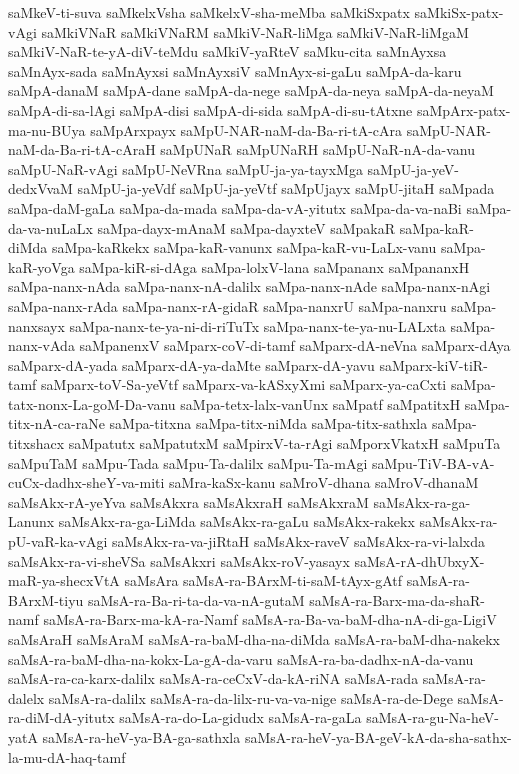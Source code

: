 {saMkeV-ti-suva
saMkelxVsha
saMkelxV-sha-meMba
saMkiSxpatx
saMkiSx-patx-vAgi
saMkiVNaR
saMkiVNaRM
saMkiV-NaR-liMga
saMkiV-NaR-liMgaM
saMkiV-NaR-te-yA-diV-teMdu
saMkiV-yaRteV
saMku-cita
saMnAyxsa
saMnAyx-sada
saMnAyxsi
saMnAyxsiV
saMnAyx-si-gaLu
saMpA-da-karu
saMpA-danaM
saMpA-dane
saMpA-da-nege
saMpA-da-neya
saMpA-da-neyaM
saMpA-di-sa-lAgi
saMpA-disi
saMpA-di-sida
saMpA-di-su-tAtxne
saMpArx-patx-ma-nu-BUya
saMpArxpayx
saMpU-NAR-naM-da-Ba-ri-tA-cAra
saMpU-NAR-naM-da-Ba-ri-tA-cAraH
saMpUNaR
saMpUNaRH
saMpU-NaR-nA-da-vanu
saMpU-NaR-vAgi
saMpU-NeVRna
saMpU-ja-ya-tayxMga
saMpU-ja-yeV-dedxVvaM
saMpU-ja-yeVdf
saMpU-ja-yeVtf
saMpUjayx
saMpU-jitaH
saMpada
saMpa-daM-gaLa
saMpa-da-mada
saMpa-da-vA-yitutx
saMpa-da-va-naBi
saMpa-da-va-nuLaLx
saMpa-dayx-mAnaM
saMpa-dayxteV
saMpakaR
saMpa-kaR-diMda
saMpa-kaRkekx
saMpa-kaR-vanunx
saMpa-kaR-vu-LaLx-vanu
saMpa-kaR-yoVga
saMpa-kiR-si-dAga
saMpa-lolxV-lana
saMpananx
saMpananxH
saMpa-nanx-nAda
saMpa-nanx-nA-dalilx
saMpa-nanx-nAde
saMpa-nanx-nAgi
saMpa-nanx-rAda
saMpa-nanx-rA-gidaR
saMpa-nanxrU
saMpa-nanxru
saMpa-nanxsayx
saMpa-nanx-te-ya-ni-di-riTuTx
saMpa-nanx-te-ya-nu-LALxta
saMpa-nanx-vAda
saMpanenxV
saMparx-coV-di-tamf
saMparx-dA-neVna
saMparx-dAya
saMparx-dA-yada
saMparx-dA-ya-daMte
saMparx-dA-yavu
saMparx-kiV-tiR-tamf
saMparx-toV-Sa-yeVtf
saMparx-va-kASxyXmi
saMparx-ya-caCxti
saMpa-tatx-nonx-La-goM-Da-vanu
saMpa-tetx-lalx-vanUnx
saMpatf
saMpatitxH
saMpa-titx-nA-ca-raNe
saMpa-titxna
saMpa-titx-niMda
saMpa-titx-sathxla
saMpa-titxshacx
saMpatutx
saMpatutxM
saMpirxV-ta-rAgi
saMporxVkatxH
saMpuTa
saMpuTaM
saMpu-Tada
saMpu-Ta-dalilx
saMpu-Ta-mAgi
saMpu-TiV-BA-vA-cuCx-dadhx-sheY-va-miti
saMra-kaSx-kanu
saMroV-dhana
saMroV-dhanaM
saMsAkx-rA-yeYva
saMsAkxra
saMsAkxraH
saMsAkxraM
saMsAkx-ra-ga-Lanunx
saMsAkx-ra-ga-LiMda
saMsAkx-ra-gaLu
saMsAkx-rakekx
saMsAkx-ra-pU-vaR-ka-vAgi
saMsAkx-ra-va-jiRtaH
saMsAkx-raveV
saMsAkx-ra-vi-lalxda
saMsAkx-ra-vi-sheVSa
saMsAkxri
saMsAkx-roV-yasayx
saMsA-rA-dhUbxyX-maR-ya-shecxVtA
saMsAra
saMsA-ra-BArxM-ti-saM-tAyx-gAtf
saMsA-ra-BArxM-tiyu
saMsA-ra-Ba-ri-ta-da-va-nA-gutaM
saMsA-ra-Barx-ma-da-shaR-namf
saMsA-ra-Barx-ma-kA-ra-Namf
saMsA-ra-Ba-va-baM-dha-nA-di-ga-LigiV
saMsAraH
saMsAraM
saMsA-ra-baM-dha-na-diMda
saMsA-ra-baM-dha-nakekx
saMsA-ra-baM-dha-na-kokx-La-gA-da-varu
saMsA-ra-ba-dadhx-nA-da-vanu
saMsA-ra-ca-karx-dalilx
saMsA-ra-ceCxV-da-kA-riNA
saMsA-rada
saMsA-ra-dalelx
saMsA-ra-dalilx
saMsA-ra-da-lilx-ru-va-va-nige
saMsA-ra-de-Dege
saMsA-ra-diM-dA-yitutx
saMsA-ra-do-La-gidudx
saMsA-ra-gaLa
saMsA-ra-gu-Na-heV-yatA
saMsA-ra-heV-ya-BA-ga-sathxla
saMsA-ra-heV-ya-BA-geV-kA-da-sha-sathx-la-mu-dA-haq-tamf
}
